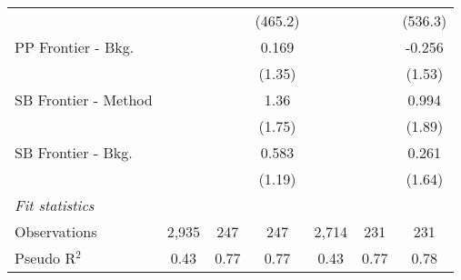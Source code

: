 \begin{tabular}{lcccccc}
                        &         &               & (465.2) &         &        & (536.3)\\   
   PP Frontier - Bkg.   &         &               & 0.169   &         &        & -0.256\\   
                        &         &               & (1.35)  &         &        & (1.53)\\   
   SB Frontier - Method &         &               & 1.36    &         &        & 0.994\\   
                        &         &               & (1.75)  &         &        & (1.89)\\   
   SB Frontier - Bkg.   &         &               & 0.583   &         &        & 0.261\\   
                        &         &               & (1.19)  &         &        & (1.64)\\   
   \midrule
   \emph{Fit statistics}\\
   Observations         & 2,935   & 247           & 247     & 2,714   & 231    & 231\\  
   Pseudo R$^2$         & 0.43    & 0.77          & 0.77    & 0.43    & 0.77   & 0.78\\  
   

\end{tabular}
